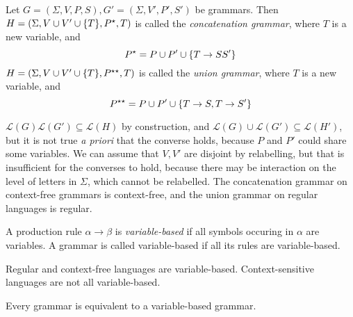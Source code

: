 \begin{definition}
	Let \( G = (\Sigma, V, P, S), G' = (\Sigma, V', P', S') \) be grammars.
	Then \( H = (\Sigma, V \cup V' \cup \qty{T}, P^\star, T) \) is called the \emph{concatenation grammar}, where \( T \) is a new variable, and
	\[ P^\star = P \cup P' \cup \qty{T \to SS'} \]
	\( H = (\Sigma, V \cup V' \cup \qty{T}, P^{\star\star}, T) \) is called the \emph{union grammar}, where \( T \) is a new variable, and
	\[ P^{\star\star} = P \cup P' \cup \qty{T \to S, T \to S'} \]
\end{definition}
\begin{remark}
	\( \mathcal L(G)\mathcal L(G') \subseteq \mathcal L(H) \) by construction, and \( \mathcal L(G) \cup \mathcal L(G') \subseteq \mathcal L(H') \), but it is not true \emph{a priori} that the converse holds, because \( P \) and \( P' \) could share some variables.
	We can assume that \( V, V' \) are disjoint by relabelling, but that is insufficient for the converses to hold, because there may be interaction on the level of letters in \( \Sigma \), which cannot be relabelled.
	The concatenation grammar on context-free grammars is context-free, and the union grammar on regular languages is regular.
\end{remark}
\begin{definition}
	A production rule \( \alpha \to \beta \) is \emph{variable-based} if all symbols occuring in \( \alpha \) are variables.
	A grammar is called variable-based if all its rules are variable-based.
\end{definition}
\begin{remark}
	Regular and context-free languages are variable-based.
	Context-sensitive languages are not all variable-based.
\end{remark}
\begin{lemma}
	Every grammar is equivalent to a variable-based grammar.
\end{lemma}
